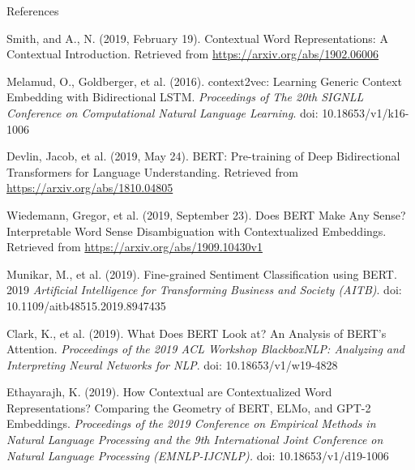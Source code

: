 

\begin{frame}{References}


\vspace{10pt}
\begin{enumerateSpaced}{4pt}
    \scriptsize
    
    \item Smith, and A., N. (2019, February 19). Contextual Word Representations: A Contextual Introduction. Retrieved from \url{https://arxiv.org/abs/1902.06006}

    \item Melamud, O., Goldberger, et al. (2016). context2vec: Learning Generic Context Embedding with Bidirectional LSTM. \emph{Proceedings of The 20th SIGNLL Conference on Computational Natural Language Learning}. doi: 10.18653/v1/k16-1006
    
    \item Devlin, Jacob, et al. (2019, May 24). BERT: Pre-training of Deep Bidirectional Transformers for Language Understanding. Retrieved from \url{https://arxiv.org/abs/1810.04805}
    
    \item Wiedemann, Gregor, et al. (2019, September 23). Does BERT Make Any Sense? Interpretable Word Sense Disambiguation with Contextualized Embeddings. Retrieved from \url{https://arxiv.org/abs/1909.10430v1}
    
    \item Munikar, M., et al. (2019). Fine-grained Sentiment Classification using BERT. 2019 \emph{Artificial Intelligence for Transforming Business and Society (AITB)}. doi: 10.1109/aitb48515.2019.8947435
    
    \item Clark, K., et al. (2019). What Does BERT Look at? An Analysis of BERT’s Attention. \emph{Proceedings of the 2019 ACL Workshop BlackboxNLP: Analyzing and Interpreting Neural Networks for NLP}. doi: 10.18653/v1/w19-4828
    
    \item Ethayarajh, K. (2019). How Contextual are Contextualized Word Representations? Comparing the Geometry of BERT, ELMo, and GPT-2 Embeddings. \emph{Proceedings of the 2019 Conference on Empirical Methods in Natural Language Processing and the 9th International Joint Conference on Natural Language Processing (EMNLP-IJCNLP).} doi: 10.18653/v1/d19-1006

\end{enumerateSpaced}
    
\end{frame}



